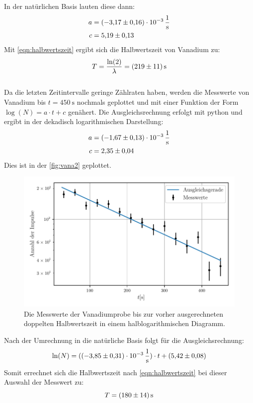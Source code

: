 In der natürlichen Basis lauten diese dann:
\begin{align*}
  a &= \SI{-3.17(16)e-3}{\per\second}\\
  c &= \num{5.19 \pm 0.13}
\end{align*}
Mit \eqref{eqn:halbwertszeit} ergibt sich die Halbwertszeit von Vanadium zu:
\begin{equation*}
  T = \frac{\ln(2)}{\lambda} = \SI{219\pm 11}{\second}
\end{equation*}
\\
Da die letzten Zeitintervalle geringe Zählraten haben, werden die Messwerte von Vanadium bis $t=\SI{450}{\second}$ nochmals geplottet und mit einer Funktion der Form $\log(N) = a\cdot t +c $ genähert.
Die Ausgleichsrechnung erfolgt mit python und ergibt in der dekadisch logarithmischen Darstellung:
\begin{align*}
  a &= \SI{-1.67(13)e-3}{\per\second}\\
  c &= \num{2.35 \pm 0.04}
\end{align*}
Dies ist in der \autoref{fig:vana2} geplottet.
\begin{figure}
  \centering
  \includegraphics{build/vana2.pdf}
  \caption{Die Messwerte der Vanadiumprobe bis zur vorher ausgerechneten doppelten Halbwertszeit in einem halblogarithmischen Diagramm.}
  \label{fig:vana2}
\end{figure}
Nach der Umrechnung in die natürliche Basis folgt für die Ausgleichsrechnung:
\begin{equation*}
  \ln(N) = (\SI{-3.85(31)e-3}{\per\second}) \cdot t + (\num{5.42 \pm 0.08})
\end{equation*}
Somit errechnet sich die Halbwertszeit nach \eqref{eqn:halbwertszeit} bei dieser Auswahl der Messwert zu:
\begin{equation*}
  T = \SI{180 \pm 14}{\second}
\end{equation*}

